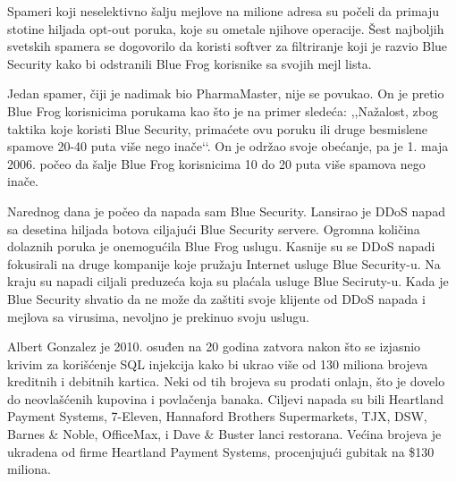 \documentclass[a4paper]{article}
\theoremstyle{break}
\begin{document}
{\begin{description}
Spameri koji neselektivno šalju mejlove na milione adresa su počeli da primaju stotine hiljada opt-out poruka, koje su ometale njihove operacije. Šest najboljih svetskih spamera se dogovorilo da koristi softver za filtriranje koji je razvio Blue Security kako bi odstranili Blue Frog korisnike sa svojih mejl lista.

Jedan spamer, čiji je nadimak bio PharmaMaster, nije se povukao. On je pretio Blue Frog korisnicima porukama kao što je na primer sledeća: ,,Nažalost, zbog taktika koje koristi Blue Security, primaćete ovu poruku ili druge besmislene spamove 20-40 puta više nego inače‘‘. On je održao svoje obećanje, pa je 1. maja 2006. počeo da šalje Blue Frog korisnicima 10 do 20 puta više spamova nego inače.

Narednog dana je počeo da napada sam Blue Security. Lansirao je DDoS napad sa desetina hiljada botova ciljajući Blue Security servere. Ogromna količina dolaznih poruka je onemogućila Blue Frog uslugu. Kasnije su se DDoS napadi fokusirali na druge kompanije koje pružaju Internet usluge Blue Security-u. Na kraju su napadi ciljali preduzeća koja su plaćala usluge Blue Seciruty-u. Kada je Blue Security shvatio da ne može da zaštiti svoje klijente od DDoS napada i mejlova sa virusima, nevoljno je prekinuo svoju uslugu.



\item[ALBERT GONZALEZ] Albert Gonzalez je 2010. osuđen na 20 godina zatvora nakon što se izjasnio krivim za korišćenje SQL injekcija kako bi ukrao više od 130 miliona brojeva kreditnih i debitnih kartica. Neki od tih brojeva su prodati onlajn, što je dovelo do neovlašćenih kupovina i povlačenja banaka. Ciljevi napada su bili Heartland Payment Systems,  7-Eleven,  Hannaford Brothers Supermarkets,  TJX,  DSW,  Barnes \& Noble, OfficeMax, i Dave \& Buster lanci restorana. Većina brojeva je ukradena od firme Heartland Payment Systems, procenjujući gubitak na \$130 miliona.
\end{description}

}
\end{document}

